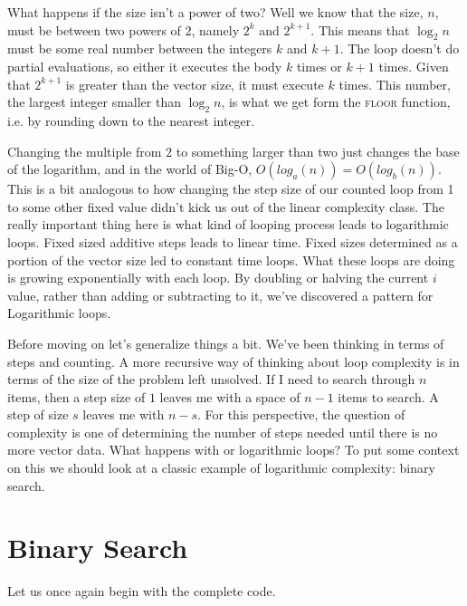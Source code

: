\documentclass[]{tufte-handout}
\begin{document}
What happens if the size isn't a power of two? Well we know that the size, $n$, must be between two powers of $2$, namely $2^k$ and $2^{k+1}$. This means that $\log_2{n}$ must be some real number between the integers $k$ and $k+1$. The loop doesn't do partial evaluations, so either it executes the body $k$ times or $k+1$ times. Given that $2^{k+1}$ is greater than the vector size, it must execute $k$ times. This number, the largest integer smaller than $\log_2{n}$, is what we get form the \textsc{floor} function, i.e. by rounding down to the nearest integer. 

Changing the multiple from $2$ to something larger than two just changes the base of the logarithm, and in the world of Big-O, $O(log_a(n)) = O(log_b(n))$. This is a bit analogous to how changing the step size of our counted loop from 1 to some other fixed value didn't kick us out of the linear complexity class. The really important thing here is what kind of looping process leads to logarithmic loops. Fixed sized additive steps leads to linear time. Fixed sizes determined as a portion of the vector size led to constant time loops. What these loops are doing is growing exponentially with each loop. By doubling or halving the current $i$ value, rather than adding or subtracting to it, we've discovered a pattern for Logarithmic loops.

Before moving on let's generalize things a bit. We've been thinking in terms of steps and counting.  A more recursive way of thinking about loop complexity is in terms of the size of the problem left unsolved. If I need to search through $n$ items, then a step size of $1$ leaves me with a space of $n-1$ items to search. A step of size $s$ leaves me with $n-s$. For this perspective, the question of complexity is one of determining the number of steps needed until there is no more vector data. What happens with or logarithmic loops? To put some context on this we should look at a classic example of logarithmic complexity: binary search.

\section{Binary Search}

Let us once again begin with the complete code. 
\end{document}
